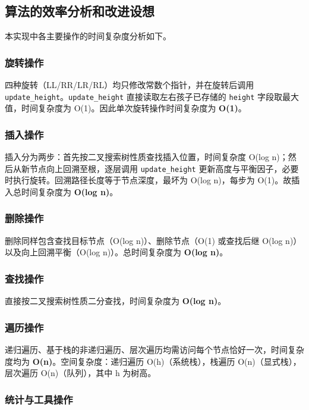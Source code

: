 \documentclass[a4paper, 12pt, oneside]{article}
\theoremstyle{cn_theorem}
\begin{document}
\subsection{算法的效率分析和改进设想}

本实现中各主要操作的时间复杂度分析如下。

\subsubsection{旋转操作}

四种旋转（LL/RR/LR/RL）均只修改常数个指针，并在旋转后调用 \texttt{update\_height}。\texttt{update\_height} 直接读取左右孩子已存储的 \texttt{height} 字段取最大值，时间复杂度为 O(1)。因此单次旋转操作时间复杂度为 \textbf{O(1)}。

\subsubsection{插入操作}

插入分为两步：首先按二叉搜索树性质查找插入位置，时间复杂度 O(log n)；然后从新节点向上回溯至根，逐层调用 \texttt{update\_height} 更新高度与平衡因子，必要时执行旋转。回溯路径长度等于节点深度，最坏为 O(log n)，每步为 O(1)。故插入总时间复杂度为 \textbf{O(log n)}。

\subsubsection{删除操作}

删除同样包含查找目标节点（O(log n)）、删除节点（O(1) 或查找后继 O(log n)）以及向上回溯平衡（O(log n)）。总时间复杂度为 \textbf{O(log n)}。

\subsubsection{查找操作}

直接按二叉搜索树性质二分查找，时间复杂度为 \textbf{O(log n)}。

\subsubsection{遍历操作}

递归遍历、基于栈的非递归遍历、层次遍历均需访问每个节点恰好一次，时间复杂度均为 \textbf{O(n)}。空间复杂度：递归遍历 O(h)（系统栈），栈遍历 O(n)（显式栈），层次遍历 O(n)（队列），其中 h 为树高。

\subsubsection{统计与工具操作}
\end{document}
